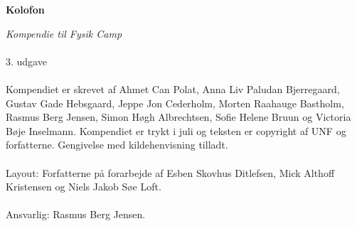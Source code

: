 \begin{center}
\textbf{Kolofon}
\end{center}
\textit{Kompendie til Fysik Camp \campyear}\\\\
3. udgave\\\\
Kompendiet er skrevet af Ahmet Can Polat, Anna Liv Paludan Bjerregaard, Gustav Gade Hebsgaard, Jeppe Jon Cederholm, Morten Raahauge Bastholm, Rasmus Berg Jensen, Simon Høgh Albrechtsen, Sofie Helene Bruun og Victoria Bøje Inselmann. Kompendiet er trykt i juli {\campyear} og teksten er copyright {\textcopyright} {\campyear} af UNF og forfatterne. Gengivelse med kildehenvisning tilladt. \\\\
  Layout: Forfatterne på forarbejde af Esben Skovhus Ditlefsen, Mick Althoff Kristensen og Niels Jakob Søe Loft.\\\\
  Ansvarlig: Rasmus Berg Jensen.